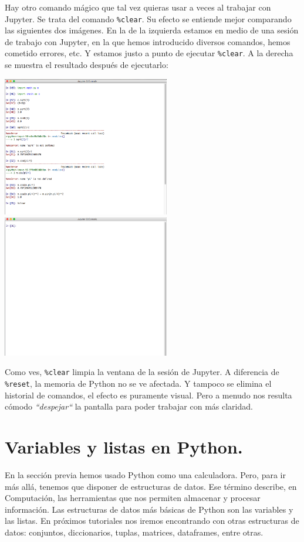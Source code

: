 \documentclass[10pt,a4paper]{article}\usepackage[]{graphicx}\usepackage[]{color}
\newcounter {cont01}
\begin{document}
Hay otro comando mágico que tal vez quieras usar a veces al trabajar con Jupyter. Se trata del comando \verb#%clear#.
Su efecto se entiende mejor comparando las siguientes dos imágenes. En la de la izquierda estamos en medio de una sesión de trabajo con Jupyter, en la que hemos introducido diversos comandos, hemos cometido errores, etc. Y estamos justo a punto de ejecutar  \verb#%clear#.
A la derecha se muestra el resultado después de ejecutarlo:
\begin{center}
\includegraphics[width=7.3cm]{../fig/Tut-02-py-02a.png}\quad
\includegraphics[width=7.3cm]{../fig/Tut-02-py-02b.png}
\end{center}
Como ves,  \verb#%clear#
limpia la ventana de la sesión de Jupyter. A diferencia de  \verb#%reset#,
la memoria de Python no se ve afectada. Y tampoco se elimina el historial de comandos, el efecto es puramente visual. Pero a menudo nos resulta cómodo {\em ``despejar``} la pantalla para poder trabajar con más claridad.

\section{Variables y listas en Python.}
\label{tut02:sec:variablesListasPython}

En la sección previa hemos usado Python como una calculadora. Pero, para ir más allá, tenemos que disponer de {\sf estructuras de datos}. Ese término describe, en Computación, las herramientas que nos permiten almacenar y procesar información. Las estructuras de datos más básicas de Python son las {\sf variables} y las {\sf listas}. En próximos tutoriales nos iremos encontrando con otras estructuras de datos: conjuntos, diccionarios, tuplas, matrices, dataframes, entre otras.
\end{document}
